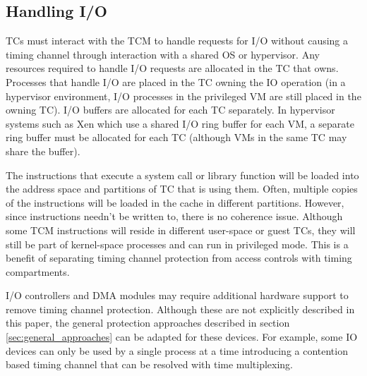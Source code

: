\subsection{Handling I/O}
TCs must interact with the TCM to handle requests for I/O without causing a 
timing channel through interaction with a shared OS or hypervisor.
Any resources required to handle I/O requests are allocated in the TC that owns.
Processes that handle I/O are placed in the TC owning the IO 
operation (in a hypervisor environment, I/O processes in the privileged
VM are still placed in the owning TC).
I/O buffers are allocated for each TC separately. In hypervisor systems such as
Xen\cite{xen-sosp03} which use a shared I/O ring buffer for each VM, a separate
ring buffer must be allocated for each TC (although VMs in the same TC may share
the buffer). 

The instructions that execute a system call or library function will be loaded
into the address space and partitions of TC that is using them. Often, multiple
copies of the instructions will be loaded in the cache in different partitions.
However, since instructions needn't be written to, there is no coherence issue. 
Although some TCM instructions will reside in different user-space or guest 
TCs, they will still be part of kernel-space processes and can run in 
privileged mode. This is a benefit of separating timing channel protection 
from access controls with timing compartments.


I/O controllers and DMA modules may require additional hardware support to 
remove timing channel protection. Although these are not explicitly described 
in this paper, the general protection approaches described in section
\ref{sec:general_approaches} can be adapted for these devices. For example,
some IO devices can only be used by a single process at a time introducing a
contention based timing channel that can be resolved with time multiplexing.

